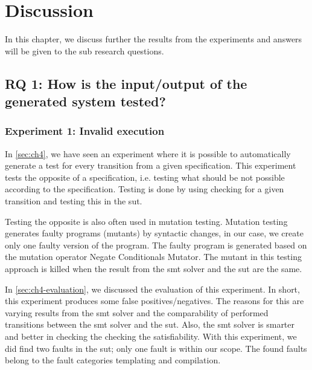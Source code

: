 \chapter{Discussion}\label{sec:ch6}

In this chapter, we discuss further the results from the experiments and answers
will be given to the sub research questions.

\section{RQ 1: How is the input/output of the generated system tested?}

\subsection{Experiment 1: Invalid execution}
In \autoref{sec:ch4}, we have seen an experiment where it is possible to
automatically generate a test for every transition from a given specification.
This experiment tests the opposite of a specification, i.e. testing what should
be not possible according to the specification. Testing is done by using
checking for a given transition and testing this in the \gls{sut}.

Testing the opposite is also often used in mutation testing. Mutation testing
generates faulty programs (mutants) by syntactic changes, in our case, we create
only one faulty version of the program. The faulty program is generated based on
the mutation operator Negate Conditionals Mutator. The mutant in this testing
approach is killed when the result from the \gls{smt} solver and the \gls{sut}
are the same.

In \autoref{sec:ch4-evaluation}, we discussed the evaluation of this experiment.
In short, this experiment produces some false positives/negatives. The reasons
for this are varying results from the \gls{smt} solver and the comparability of
performed transitions between the \gls{smt} solver and the \gls{sut}. Also, the
\gls{smt} solver is smarter and better in checking the checking the
satisfiability. With this experiment, we did find two faults in the \gls{sut};
only one fault is within our scope. The found faults belong to the fault categories
templating and compilation.

